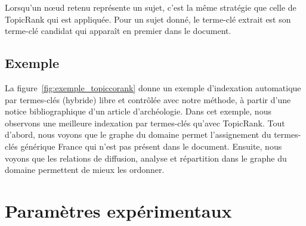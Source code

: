     Lorsqu'un n\oe{}ud retenu représente un sujet, c'est la même stratégie
    que celle de Topic\-Rank qui est appliquée. Pour un sujet donné, le
    terme-clé extrait est son terme-clé candidat qui apparaît en premier
    dans le document.

  \subsection{Exemple}
  \label{subsec:main-domain_specific_keyphrase_annotation-supervised_automatic_keyphrase_extraction-topiccorank-exemple}
    La figure~\ref{fig:exemple_topiccorank} donne un exemple d'indexation
    automatique par termes-clés (hybride) libre et contrôlée avec notre méthode, à partir d'une notice
    bibliographique d'un article d'archéologie. Dans cet exemple, nous observons
    une meilleure indexation par termes-clés qu'avec TopicRank. Tout d'abord,
    nous voyons que le graphe du domaine permet l'assignement du termes-clés
    générique \og{}France\fg{} qui n'est pas présent dans le document. Ensuite,
    nous voyons que les relations de \og{}diffusion\fg{}, \og{}analyse\fg{} et
    \og{}répartition\fg{} dans le graphe du domaine permettent de mieux les
    ordonner.
    

\section{Paramètres expérimentaux}
\label{sec:main-domain_specific_keyphrase_annotation-supervised_automatic_keyphrase_annotation-evaluation}
